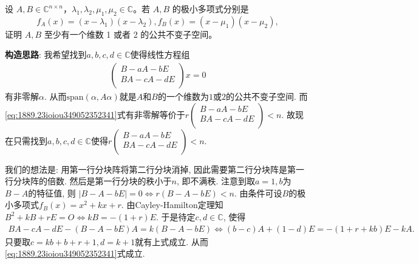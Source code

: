 \documentclass[../../main.tex]{subfiles}%
\begin{document}
\begin{proposition}\label{proposition:二次极小多项式由单因式分解必存在公共不变子空间}
设 \( A,B \in \mathbb{C}^{n \times n} \)，\( \lambda_1,\lambda_2,\mu_1,\mu_2 \in \mathbb{C} \)。若 \( A,B \) 的极小多项式分别是
\[ f_A(x) = (x - \lambda_1)(x - \lambda_2), f_B(x) = (x - \mu_1)(x - \mu_2), \]
证明 \( A,B \) 至少有一个维数 1 或者 2 的公共不变子空间。
\end{proposition}
\begin{note}
\textbf{构造思路}: 我希望找到$a,b,c,d\in \mathbb{C}$使得线性方程组
\begin{align}
\left( \begin{array}{c}
B-aA-bE\\
BA-cA-dE\\
\end{array} \right) x=0 \label{eq:1889.23ioiou349052352341}
\end{align}
有非零解$\alpha$. 从而$\mathrm{span}\left( \alpha ,A\alpha \right)$就是$A$和$B$的一个维数为$1$或$2$的公共不变子空间. 而\eqref{eq:1889.23ioiou349052352341}式有非零解等价于$r\left( \begin{array}{c}
B-aA-bE\\
BA-cA-dE\\
\end{array} \right) <n$. 故现在只需找到$a,b,c,d\in \mathbb{C}$使得$r\left( \begin{array}{c}
B-aA-bE\\
BA-cA-dE\\
\end{array} \right) <n$.

我们的想法是: 用第一行分块阵将第二行分块消掉, 因此需要第二行分块阵是第一行分块阵的倍数.
然后是第一行分块的秩小于$n$, 即不满秩. 注意到取$a=1,b$为$B-A$的特征值, 则
$| B-A-bE |=0\Longleftrightarrow r\left( B-A-bE \right) <n.$
由条件可设$B$的极小多项式$f_B\left( x \right) =x^2+kx+r$. 由Cayley-Hamilton定理知
$B^2+kB+rE=O\Longleftrightarrow kB=-\left( 1+r \right) E.$
于是待定$c,d\in \mathbb{C}$, 使得
\begin{align*}
BA-cA-dE-\left( B-A-bE \right) A=k\left( B-A-bE \right) 
\Longleftrightarrow \left( b-c \right) A+\left( 1-d \right) E=-\left( 1+r+kb \right) E-kA.
\end{align*}
只要取$c=kb+b+r+1,d=k+1$就有上式成立. 从而\eqref{eq:1889.23ioiou349052352341}式成立.
\end{note}
\end{document}
